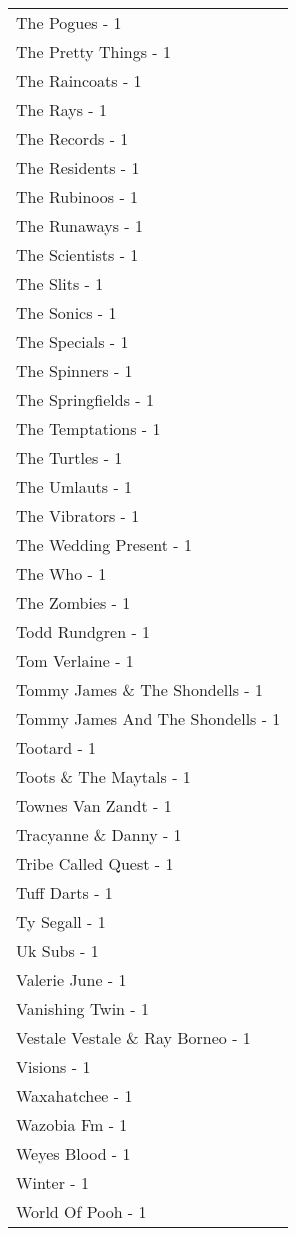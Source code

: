\documentclass[
]{article}
\begin{document}
\begin{longtable}{l}
The Pogues - 1 \\ 
The Pretty Things - 1 \\ 
The Raincoats - 1 \\ 
The Rays - 1 \\ 
The Records - 1 \\ 
The Residents - 1 \\ 
The Rubinoos - 1 \\ 
The Runaways - 1 \\ 
The Scientists - 1 \\ 
The Slits - 1 \\ 
The Sonics - 1 \\ 
The Specials - 1 \\ 
The Spinners - 1 \\ 
The Springfields - 1 \\ 
The Temptations - 1 \\ 
The Turtles - 1 \\ 
The Umlauts - 1 \\ 
The Vibrators - 1 \\ 
The Wedding Present - 1 \\ 
The Who - 1 \\ 
The Zombies - 1 \\ 
Todd Rundgren - 1 \\ 
Tom Verlaine - 1 \\ 
Tommy James \& The Shondells - 1 \\ 
Tommy James And The Shondells - 1 \\ 
Tootard - 1 \\ 
Toots \& The Maytals - 1 \\ 
Townes Van Zandt - 1 \\ 
Tracyanne \& Danny - 1 \\ 
Tribe Called Quest - 1 \\ 
Tuff Darts - 1 \\ 
Ty Segall - 1 \\ 
Uk Subs - 1 \\ 
Valerie June - 1 \\ 
Vanishing Twin - 1 \\ 
Vestale Vestale \& Ray Borneo - 1 \\ 
Visions - 1 \\ 
Waxahatchee - 1 \\ 
Wazobia Fm - 1 \\ 
Weyes Blood - 1 \\ 
Winter - 1 \\ 
World Of Pooh - 1 \\ 

\end{longtable}
\end{document}
